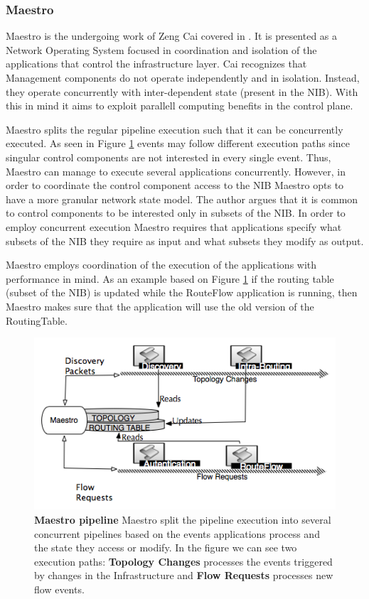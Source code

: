 \subsubsection{Maestro}

Maestro is the undergoing work of Zeng Cai covered in
\cite{maestro}. It is presented as a Network Operating System focused
in coordination and isolation of the applications  that control the
infrastructure layer. Cai recognizes that Management components do not
operate independently and in isolation. Instead, they operate
concurrently with inter-dependent state (present in the NIB). With this in mind
it aims to exploit parallell computing benefits in the control plane. 

Maestro splits the regular pipeline execution such that it can
be concurrently executed. As seen in Figure \ref{fig:maestro-pipeline} events may
follow different execution paths since singular control components are
not interested in every single event. Thus, Maestro can manage to
execute several applications concurrently. However, in order to
coordinate the control component access to the NIB Maestro opts to
have a more granular network state model. The author argues that it is
common to control components to be  interested only in  subsets of the
NIB. In order to employ concurrent execution Maestro requires that
applications specify  what subsets of the NIB they require as input
and what subsets they modify as output. 

Maestro employs
coordination of the  execution of the applications with performance in
mind. As an example based on Figure \ref{fig:maestro-pipeline} if the routing table
(subset of the NIB) is updated while the RouteFlow application is running, then
Maestro makes sure that the application will use the old version of
the RoutingTable.

\begin{figure}
  \centering 
  \footnotesize
  \includegraphics[scale=0.5]{pic/maestro-pipeline.png}
  \caption[Maestro pipeline]{\textbf{Maestro pipeline} Maestro split the pipeline execution
  into several concurrent pipelines based on the events applications
  process and the state they access or modify. In the figure we can
  see two execution paths: \textbf{Topology Changes} processes the
  events triggered by changes in the Infrastructure and \textbf{Flow
    Requests} processes new flow events.}
  \label{fig:maestro-pipeline}
\end{figure}


